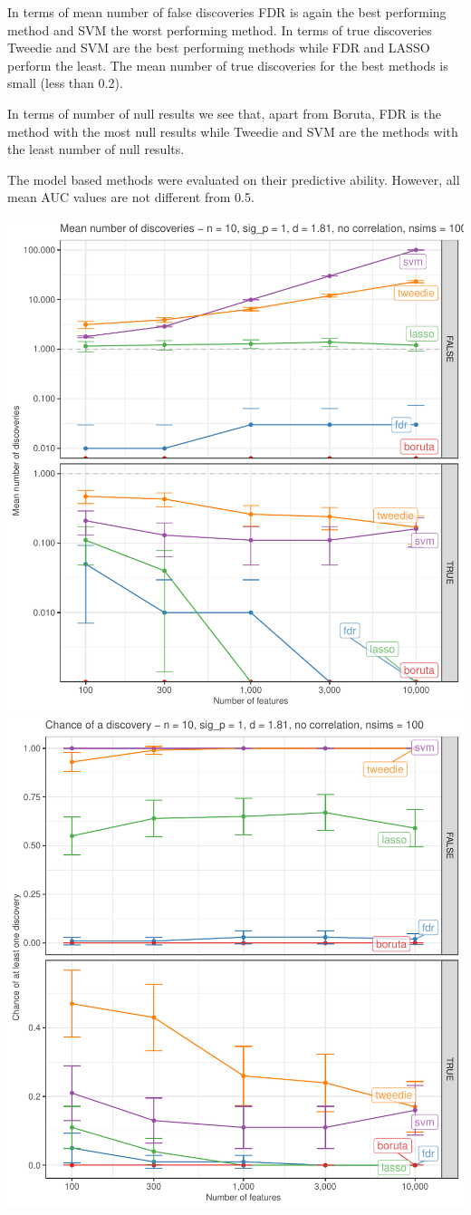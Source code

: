 \documentclass[
]{article}
\begin{document}
In terms of mean number of false discoveries FDR is again the best performing method and SVM the worst performing method. In terms of true discoveries Tweedie and SVM are the best performing methods while FDR and LASSO perform the least. The mean number of true discoveries for the best methods is small (less than 0.2).

In terms of number of null results we see that, apart from Boruta, FDR is the method with the most null results while Tweedie and SVM are the methods with the least number of null results.

The model based methods were evaluated on their predictive ability. However, all mean AUC values are not different from 0.5.

\begin{center}\includegraphics[width=0.49\linewidth]{main_files/figure-latex/unnamed-chunk-44-1} \includegraphics[width=0.49\linewidth]{main_files/figure-latex/unnamed-chunk-44-2} \end{center}
\end{document}
